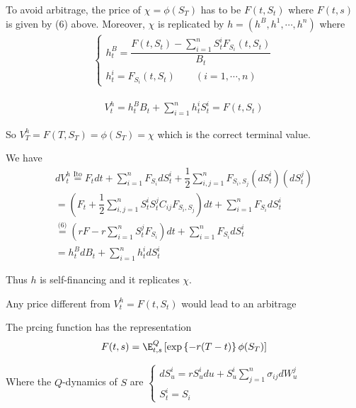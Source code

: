 \begin{theo}[]{}
  To avoid arbitrage, the price of $\chi = \phi(S_T)$ has to be $F(t,S_t)$ where $F(t,s)$ is given by (6) above. Moreover, $\chi$ is replicated by $h = (h^B,h^1,\cdots,h^n)$ where
  \begin{equation*}
    \begin{gathered}
      \begin{cases}
        h_t^B = \dfrac{F(t,S_t)-\sum_{i=1}^{n}S_t^iF_{S_i}(t,S_t)}{B_t}\\
        h_t^i = F_{S_i}(t,S_t)\qquad(i=1,\cdots,n)
      \end{cases}
    \end{gathered}
  \end{equation*}
\end{theo}
\par\bigskip
\begin{prf}[]{}
  \begin{equation*}
    \begin{gathered}
      V_t^h = h_t^BB_t+\sum_{i=1}^{n}h_t^iS_t^i =F(t,S_t)
    \end{gathered}
  \end{equation*}\par
  \noindent So $V_T^h = F(T,S_T) = \phi(S_T) = \chi$ which is the correct terminal value.\par
  \noindent We have
  \begin{equation*}
    \begin{gathered}
      dV_t^h\stackrel{\text{Ito}}{=} F_tdt+\sum_{i=1}^{n}F_{S_i}dS_t^i+\dfrac{1}{2}\sum_{i,j=1}^{n}F_{S_i,S_j}(dS_t^i)(dS_t^j)\\
      = \left(F_t+\dfrac{1}{2}\sum_{i,j=1}^{n}S_t^iS_t^jC_{ij}F_{S_i,S_j}\right)dt+\sum_{i=1}^{n}F_{S_i}dS_t^i\\
      \stackrel{\text{(6)}}{=} \left(rF-r\sum_{i=1}^{n}S_t^jF_{S_i}\right)dt+\sum_{i=1}^{n}F_{S_i}dS_t^i\\
      =h_t^BdB_t+\sum_{i=1}^{n}h_t^idS_t^i
    \end{gathered}
  \end{equation*}
  \par\bigskip
  \noindent Thus $h$ is self-financing and it replicates $\chi$.\par
  \noindent  Any price different from $V_t^h=F(t,S_t)$ would lead to an arbitrage
\end{prf}
\par\bigskip
\begin{theo}{}
  The prcing function has the representation 
  \begin{equation*}
    \begin{gathered}
      F(t,s) = \E_{t,s}^Q\left[\text{exp}\left\{-r(T-t)\right\}\phi(S_T)\right]
    \end{gathered}
  \end{equation*}\par
  \noindent Where the $Q$-dynamics of $S$ are $\begin{cases}
    dS_u^i=rS_u^idu+S_u^i\sum_{j=1}^{n}\sigma_{ij}dW_u^j\\S_t^i=S_i
  \end{cases}$
\end{theo}
\par\bigskip
